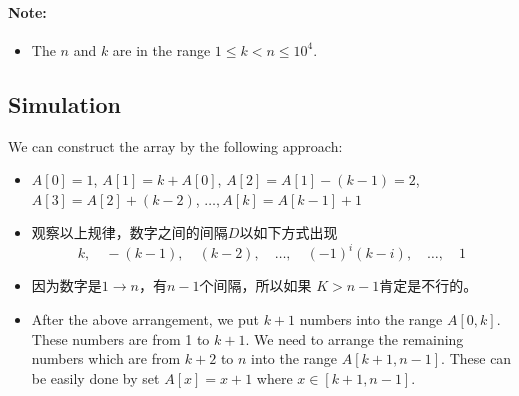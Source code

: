\paragraph{Note:}
\begin{itemize}
\item The $n$ and $k$ are in the range $1 \leq k < n \leq 10^4$.
\end{itemize}

\subsection{Simulation}
We can construct the array by the following approach:

\begin{itemize}
\item $A[0] = 1$, $A[1] = k+A[0]$, $A[2] = A[1] - (k-1) = 2$, $A[3] = A[2] + (k-2)$, $\ldots, A[k] = A[k-1] + 1$
\item 观察以上规律，数字之间的间隔$D$以如下方式出现
\[
k,\quad -(k-1), \quad (k-2), \quad \ldots, \quad (-1)^{i}(k-i), \quad \dots, \quad 1
\]
\item 因为数字是$1\to n$，有$n-1$个间隔，所以如果 $K > n-1$肯定是不行的。 
\item After the above arrangement, we put $k+1$ numbers into the range $A[0, k]$. These numbers are from 1 to $k+1$. We need to arrange the remaining numbers which are from $k+2$ to $n$ into the range $A[k+1,n-1]$. These can be easily done by set $A[x]=x+1$ where $x\in [k+1, n-1]$.
\end{itemize}

